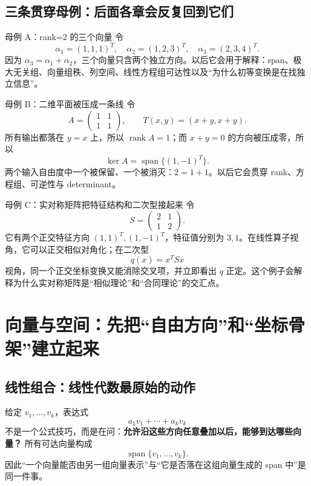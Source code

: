\documentclass[11pt,a4paper,openany]{ctexbook}
\newcommand{\key}[1]{\textbf{\color{deep}#1}}
\begin{document}
\section{三条贯穿母例：后面各章会反复回到它们}

\begin{examplebox}{母例 A：rank=2 的三个向量}
令
\[
\alpha_1=(1,1,1)^T,\quad \alpha_2=(1,2,3)^T,\quad \alpha_3=(2,3,4)^T.
\]
因为 $\alpha_3=\alpha_1+\alpha_2$，三个向量只含两个独立方向。以后它会用于解释：span、极大无关组、向量组秩、列空间、线性方程组可达性以及“为什么初等变换是在找独立信息”。
\end{examplebox}

\begin{examplebox}{母例 B：二维平面被压成一条线}
令
\[
A=\begin{pmatrix}1&1\\1&1\end{pmatrix},\qquad T(x,y)=(x+y,x+y).
\]
所有输出都落在 $y=x$ 上，所以 $\operatorname{rank}A=1$；而 $x+y=0$ 的方向被压成零，所以
\[
\ker A=\operatorname{span}\{(1,-1)^T\}.
\]
两个输入自由度中一个被保留、一个被消灭：$2=1+1$。以后它会贯穿 rank、方程组、可逆性与 determinant。
\end{examplebox}

\begin{examplebox}{母例 C：实对称矩阵把特征结构和二次型接起来}
令
\[
S=\begin{pmatrix}2&1\\1&2\end{pmatrix}.
\]
它有两个正交特征方向 $(1,1)^T,(1,-1)^T$，特征值分别为 $3,1$。在线性算子视角，它可以正交相似对角化；在二次型
\[
q(x)=x^TSx
\]
视角，同一个正交坐标变换又能消除交叉项，并立即看出 $q$ 正定。这个例子会解释为什么实对称矩阵是“相似理论”和“合同理论”的交汇点。
\end{examplebox}

\chapter{向量与空间：先把“自由方向”和“坐标骨架”建立起来}

\section{线性组合：线性代数最原始的动作}
给定 $v_1,\dots,v_k$，表达式
\[
a_1v_1+\cdots+a_kv_k
\]
不是一个公式技巧，而是在问：\key{允许沿这些方向任意叠加以后，能够到达哪些向量？}
所有可达向量构成
\[
\operatorname{span}\{v_1,\dots,v_k\}.
\]
因此“一个向量能否由另一组向量表示”与“它是否落在这组向量生成的 span 中”是同一件事。
\end{document}
